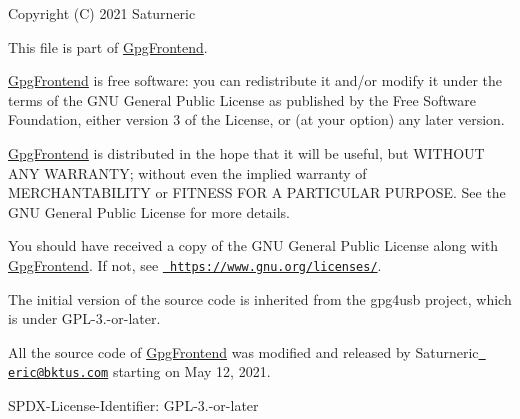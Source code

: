 Copyright (C) 2021 Saturneric

This file is part of \mbox{\hyperlink{namespaceGpgFrontend}{Gpg\+Frontend}}.

\mbox{\hyperlink{namespaceGpgFrontend}{Gpg\+Frontend}} is free software\+: you can redistribute it and/or modify it under the terms of the GNU General Public License as published by the Free Software Foundation, either version 3 of the License, or (at your option) any later version.

\mbox{\hyperlink{namespaceGpgFrontend}{Gpg\+Frontend}} is distributed in the hope that it will be useful, but WITHOUT ANY WARRANTY; without even the implied warranty of MERCHANTABILITY or FITNESS FOR A PARTICULAR PURPOSE. See the GNU General Public License for more details.

You should have received a copy of the GNU General Public License along with \mbox{\hyperlink{namespaceGpgFrontend}{Gpg\+Frontend}}. If not, see \href{https://www.gnu.org/licenses/}{\texttt{ https\+://www.\+gnu.\+org/licenses/}}.

The initial version of the source code is inherited from the gpg4usb project, which is under GPL-\/3.-\/or-\/later.

All the source code of \mbox{\hyperlink{namespaceGpgFrontend}{Gpg\+Frontend}} was modified and released by Saturneric\href{mailto:eric@bktus.com}{\texttt{ eric@bktus.\+com}} starting on May 12, 2021.

SPDX-\/\+License-\/\+Identifier\+: GPL-\/3.-\/or-\/later 